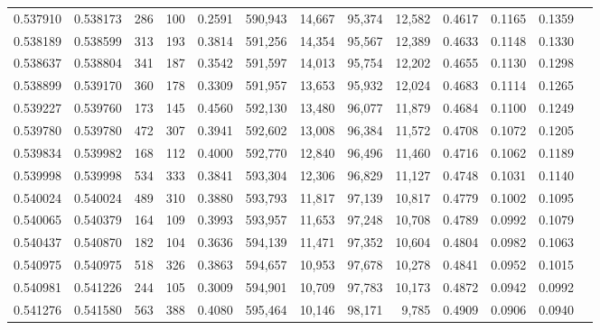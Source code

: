 \begin{tabular}{rrrrrrrrrrrrr}
0.537910 & 0.538173 &   286 &   100 &                                     0.2591 & 590,943 &  14,667 &  95,374 &  12,582 & 0.4617 & 0.1165 & 0.1359 \\
0.538189 & 0.538599 &   313 &   193 &                                     0.3814 & 591,256 &  14,354 &  95,567 &  12,389 & 0.4633 & 0.1148 & 0.1330 \\
0.538637 & 0.538804 &   341 &   187 &                                     0.3542 & 591,597 &  14,013 &  95,754 &  12,202 & 0.4655 & 0.1130 & 0.1298 \\
0.538899 & 0.539170 &   360 &   178 &                                     0.3309 & 591,957 &  13,653 &  95,932 &  12,024 & 0.4683 & 0.1114 & 0.1265 \\
0.539227 & 0.539760 &   173 &   145 &                                     0.4560 & 592,130 &  13,480 &  96,077 &  11,879 & 0.4684 & 0.1100 & 0.1249 \\
0.539780 & 0.539780 &   472 &   307 &                                     0.3941 & 592,602 &  13,008 &  96,384 &  11,572 & 0.4708 & 0.1072 & 0.1205 \\
0.539834 & 0.539982 &   168 &   112 &                                     0.4000 & 592,770 &  12,840 &  96,496 &  11,460 & 0.4716 & 0.1062 & 0.1189 \\
0.539998 & 0.539998 &   534 &   333 &                                     0.3841 & 593,304 &  12,306 &  96,829 &  11,127 & 0.4748 & 0.1031 & 0.1140 \\
0.540024 & 0.540024 &   489 &   310 &                                     0.3880 & 593,793 &  11,817 &  97,139 &  10,817 & 0.4779 & 0.1002 & 0.1095 \\
0.540065 & 0.540379 &   164 &   109 &                                     0.3993 & 593,957 &  11,653 &  97,248 &  10,708 & 0.4789 & 0.0992 & 0.1079 \\
0.540437 & 0.540870 &   182 &   104 &                                     0.3636 & 594,139 &  11,471 &  97,352 &  10,604 & 0.4804 & 0.0982 & 0.1063 \\
0.540975 & 0.540975 &   518 &   326 &                                     0.3863 & 594,657 &  10,953 &  97,678 &  10,278 & 0.4841 & 0.0952 & 0.1015 \\
0.540981 & 0.541226 &   244 &   105 &                                     0.3009 & 594,901 &  10,709 &  97,783 &  10,173 & 0.4872 & 0.0942 & 0.0992 \\
0.541276 & 0.541580 &   563 &   388 &                                     0.4080 & 595,464 &  10,146 &  98,171 &   9,785 & 0.4909 & 0.0906 & 0.0940 \\

\end{tabular}
